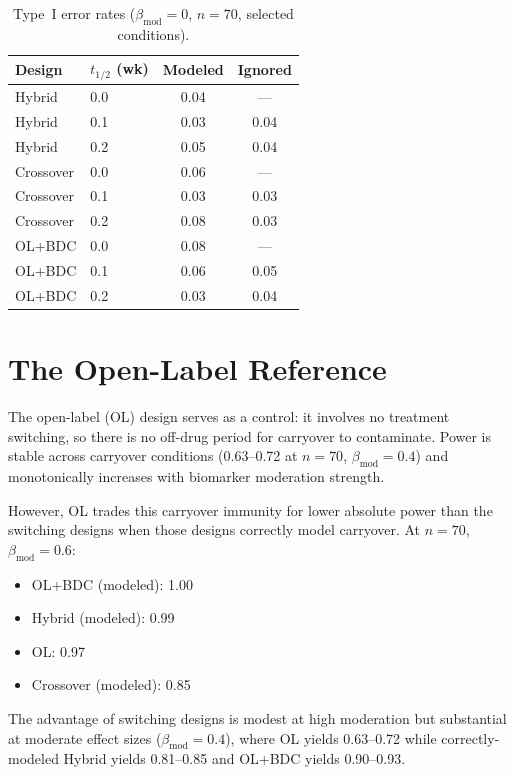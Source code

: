 \documentclass[11pt]{article}
\begin{document}
\begin{table}[ht]
\centering
\caption{Type~I error rates ($\beta_{\mathrm{mod}}=0$,
$n=70$, selected conditions).}
\label{tab:type1}
\begin{tabular}{ll cc}
\toprule
Design & $t_{1/2}$ (wk) & Modeled & Ignored \\
\midrule
Hybrid    & 0.0 & 0.04 & --- \\
Hybrid    & 0.1 & 0.03 & 0.04 \\
Hybrid    & 0.2 & 0.05 & 0.04 \\
\addlinespace
Crossover & 0.0 & 0.06 & --- \\
Crossover & 0.1 & 0.03 & 0.03 \\
Crossover & 0.2 & 0.08 & 0.03 \\
\addlinespace
OL+BDC    & 0.0 & 0.08 & --- \\
OL+BDC    & 0.1 & 0.06 & 0.05 \\
OL+BDC    & 0.2 & 0.03 & 0.04 \\
\bottomrule
\end{tabular}
\end{table}

\section{The Open-Label Reference}

The open-label (OL) design serves as a control:
it involves no treatment switching, so there is no
off-drug period for carryover to contaminate.
Power is stable across carryover conditions
(0.63--0.72 at $n=70$, $\beta_{\mathrm{mod}}=0.4$)
and monotonically increases with biomarker moderation
strength.

However, OL trades this carryover immunity for lower
absolute power than the switching designs when those
designs correctly model carryover.
At $n=70$, $\beta_{\mathrm{mod}}=0.6$:

\begin{itemize}[nosep]
  \item OL+BDC (modeled): 1.00
  \item Hybrid (modeled): 0.99
  \item OL: 0.97
  \item Crossover (modeled): 0.85
\end{itemize}

\noindent
The advantage of switching designs is modest at high
moderation but substantial at moderate effect sizes
($\beta_{\mathrm{mod}}=0.4$), where OL yields 0.63--0.72
while correctly-modeled Hybrid yields 0.81--0.85 and
OL+BDC yields 0.90--0.93.
\end{document}
